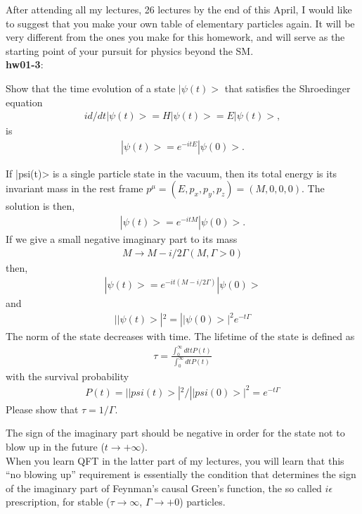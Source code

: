   After attending all my lectures, 26 lectures by the end of
  this April, I would like to suggest that you make your
  own table of elementary particles again.  It will be very
  different from the ones you make for this homework, and
  will serve as the starting point of your pursuit for
  physics beyond the SM.\\

{\bf hw01-3}:

  Show that the time evolution of a state $|\psi(t)>$
  that satisfies the Shroedinger equation
  \begin{eqnarray}
    i d/dt |\psi(t)> = H |\psi(t)> = E |\psi(t)>,
  \end{eqnarray}
  is
  \begin{eqnarray}
  |\psi(t)> = e^{-itE} |\psi(0)>.
  \end{eqnarray}

  If |psi(t)> is a single particle state in the vacuum,
  then its total energy is its invariant mass in the
  rest frame $p^\mu = (E, p_x, p_y, p_z) = (M, 0, 0, 0)$.
  The solution is then,
  \begin{eqnarray}
  |\psi(t)> = e^{-itM} |\psi(0)>.
  \end{eqnarray}
  If we give a small negative imaginary part to its mass
  \begin{eqnarray}
  M \to M - i/2 \Gamma (M, \Gamma > 0)
  \end{eqnarray}
  then,
  \begin{eqnarray}
  |\psi(t)> = e^{ -it(M - i/2 \Gamma) } |\psi(0)>
  \end{eqnarray}
  and
  \begin{eqnarray}
  | |\psi(t)> |^2 = | |\psi(0)> |^2 e^{-t\Gamma}
  \end{eqnarray}
  The norm of the state decreases with time.  The lifetime
  of the state is defined as
  \begin{eqnarray}
  \tau = \frac{\int_0^\infty dt t P(t)}{\int_0^\infty dt P(t)}
  \end{eqnarray}
  with the survival probability
  \begin{eqnarray}
  P(t) = ||psi(t)>|^2 / ||psi(0)>|^2 = e^{-t\Gamma}
  \end{eqnarray}
  Please show that $\tau = 1/\Gamma$.

  The sign of the imaginary part should be negative in order
  for the state not to blow up in the future ($t \to +\infty$).\\

  When you learn QFT in the latter part of my lectures, you
  will learn that this ``no blowing up'' requirement is essentially
  the condition that determines the sign of the imaginary part
  of Feynman's causal Green's function, the so called
  $i\epsilon$ prescription, for stable
  ($\tau \to \infty$, $\Gamma \to +0$) particles.\\

